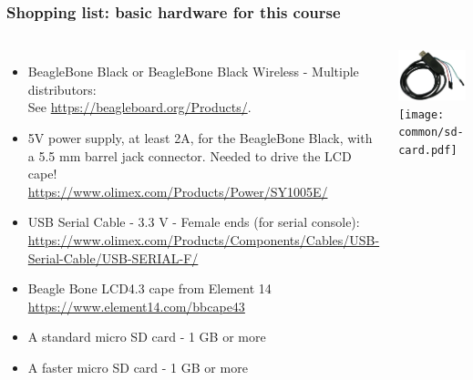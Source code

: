 \begin{frame}
\frametitle{Shopping list: basic hardware for this course}
  \begin{columns}
    \begin{itemize}
      \item BeagleBone Black or BeagleBone Black Wireless - Multiple distributors: \\
	    See \url{https://beagleboard.org/Products/}.
      \item 5V power supply, at least 2A, for the BeagleBone Black, with a 5.5 mm barrel
            jack connector. Needed to drive the LCD cape!\\
	    \url{https://www.olimex.com/Products/Power/SY1005E/}
      \item USB Serial Cable - 3.3 V - Female ends (for serial console): \\
	    \url{https://www.olimex.com/Products/Components/Cables/USB-Serial-Cable/USB-SERIAL-F/}
      \item Beagle Bone LCD4.3 cape from Element 14\\
            \url{https://www.element14.com/bbcape43}
      \item A standard micro SD card - 1 GB or more
      \item A faster micro SD card - 1 GB or more
    \end{itemize}
    \includegraphics[height=0.20\textheight]{common/usb-serial-cable-female.png} \\
    \texttt{[image: common/sd-card.pdf]} \\
  \end{columns}
\end{frame}

